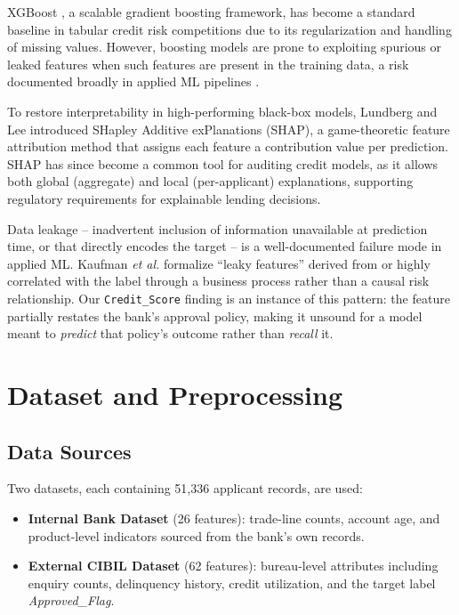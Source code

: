 \documentclass[conference]{IEEEtran}
\begin{document}
XGBoost \cite{chen2016xgboost}, a scalable gradient boosting framework, has become a standard baseline in tabular credit risk competitions due to its regularization and handling of missing values. However, boosting models are prone to exploiting spurious or leaked features when such features are present in the training data, a risk documented broadly in applied ML pipelines \cite{kaufman2012leakage}.

To restore interpretability in high-performing black-box models, Lundberg and Lee \cite{lundberg2017shap} introduced SHapley Additive exPlanations (SHAP), a game-theoretic feature attribution method that assigns each feature a contribution value per prediction. SHAP has since become a common tool for auditing credit models, as it allows both global (aggregate) and local (per-applicant) explanations, supporting regulatory requirements for explainable lending decisions.

Data leakage -- inadvertent inclusion of information unavailable at prediction time, or that directly encodes the target -- is a well-documented failure mode in applied ML. Kaufman \textit{et al.} \cite{kaufman2012leakage} formalize ``leaky features'' derived from or highly correlated with the label through a business process rather than a causal risk relationship. Our \texttt{Credit\_Score} finding is an instance of this pattern: the feature partially restates the bank's approval policy, making it unsound for a model meant to \textit{predict} that policy's outcome rather than \textit{recall} it.

\section{Dataset and Preprocessing}

\subsection{Data Sources}

Two datasets, each containing 51{,}336 applicant records, are used:

\begin{itemize}
    \item \textbf{Internal Bank Dataset} (26 features): trade-line counts, account age, and product-level indicators sourced from the bank's own records.
    \item \textbf{External CIBIL Dataset} (62 features): bureau-level attributes including enquiry counts, delinquency history, credit utilization, and the target label \textit{Approved\_Flag}.
\end{itemize}
\end{document}
